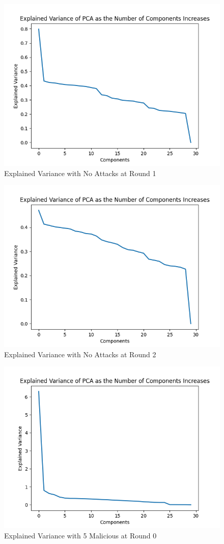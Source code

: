 \begin{figure}[htbp]
	\centering
    \includegraphics[scale=0.5]{my_agg/graphs/0_r1.png}
	\caption{Explained Variance with No Attacks at Round 1}
	\label{fig:pca_01}
\end{figure}

\begin{figure}[htbp]
	\centering
    \includegraphics[scale=0.5]{my_agg/graphs/0_r2.png}
	\caption{Explained Variance with No Attacks at Round 2}
	\label{fig:pca_02}
\end{figure}

\begin{figure}[htbp]
	\centering
    \includegraphics[scale=0.5]{my_agg/graphs/5_r0.png}
	\caption{Explained Variance with 5 Malicious at Round 0}
	\label{fig:pca_50}
\end{figure}